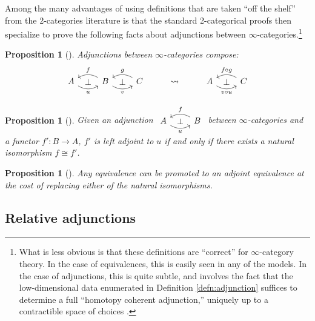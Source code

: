 \documentclass[11pt]{ctexart}
\newtheorem{prop}[thm]{Proposition}
\theoremstyle{definition}
\theoremstyle{remark}
\numberwithin{equation}{section}
\newcommand{\1}{\mathbbe{1}}
\newcommand{\2}{\mathbbe{2}}
\newcommand{\3}{\mathbbe{3}}
\begin{document}
Among the many advantages of using definitions that are taken ``off the shelf'' from the 2-categories literature is that the standard 2-categorical proofs then specialize to prove the following facts about adjunctions between $\infty$-categories.\footnote{What is less obvious is that these definitions are ``correct'' for $\infty$-category theory. In the case of equivalences, this is easily seen in any of the models. In the case of adjunctions, this is quite subtle, and involves the fact that the low-dimensional data enumerated in Definition \ref{defn:adjunction} suffices to determine a full ``homotopy coherent adjunction,'' uniquely up to a contractible space of choices \cite{RV-adj}.}

\begin{prop}[{\cite[2.1.9]{RV}}] Adjunctions between $\infty$-categories compose: 
    \[\begin{tikzcd}
        A \arrow[r, bend right, "u"'] \arrow[r, phantom, "\bot"] & B \arrow[l, bend right, "f"'] \arrow[r, bend right, "v"'] \arrow[r, phantom, "\bot"] & C \arrow[l, bend right, "g"'] & \rightsquigarrow & A \arrow[r, bend right, "v \circ u"'] \arrow[r, phantom, "\bot"] & C \arrow[l, "f \circ g"', bend right]
    \end{tikzcd}
    \]
\end{prop}

\begin{prop}[{\cite[2.1.10]{RV}}]
Given an adjunction  $\begin{tikzcd}
    A \arrow[r, bend right, "u"'] \arrow[r, phantom, "\bot"] & B \arrow[l, bend right, "f"']
\end{tikzcd}$ between $\infty$-cat\-e\-gories 
and a functor $f' \colon B \to A$,  $f'$ is left adjoint to $u$ if and only if there exists a natural isomorphism $f \cong f'$.
\end{prop}

\begin{prop}[{\cite[2.1.12]{RV}}]     Any equivalence can be promoted to an adjoint equivalence at the cost of replacing either of the natural isomorphisms.
\end{prop}


\subsection*{Relative adjunctions}
\end{document}
